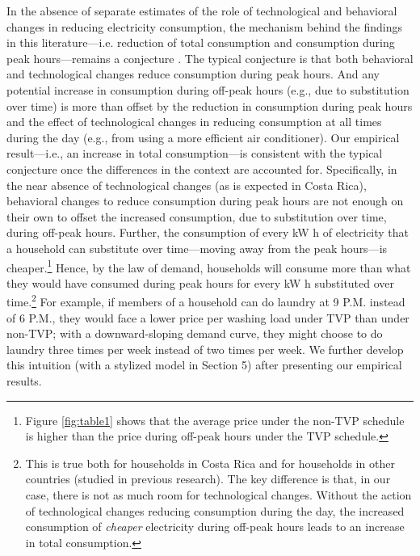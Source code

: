 \documentclass[12pt]{article}
\begin{document}
\sloppy In the absence of separate estimates of the role of technological and behavioral changes in reducing electricity consumption, the mechanism behind the findings in this literature---i.e.  reduction of total consumption and consumption during peak hours---remains a conjecture \citep{allcottRethinkingRealtimeElectricity2011,jessoeUnderstandingRolePrice2014}. The typical conjecture is that both behavioral and technological changes reduce consumption during peak hours. And any potential increase in consumption during off-peak hours (e.g., due to substitution over time) is more than offset by the reduction in consumption during peak hours and the effect of technological changes in reducing consumption at all times during the day (e.g., from using a more efficient air conditioner). Our empirical result---i.e., an increase in total consumption---is consistent with the typical conjecture once the differences in the context are accounted for. Specifically, in the near absence of technological changes (as is expected in Costa Rica), behavioral changes to reduce consumption during peak hours are not enough on their own to offset the increased consumption, due to substitution over time, during off-peak hours. Further, the consumption of every kW h of electricity that a household can substitute over time---moving away from the peak hours---is cheaper.\footnote{Figure \ref{fig:table1} shows that the average price under the non-TVP schedule is higher than the price during off-peak hours under the TVP schedule.} Hence, by the law of demand, households will consume more than what they would have consumed during peak hours for every kW h substituted over time.\footnote{This is true both for households in Costa Rica and for households in other countries (studied in previous research). The key difference is that, in our case, there is not as much room for technological changes. Without the action of technological changes reducing consumption during the day, the increased consumption of \emph{cheaper} electricity during off-peak hours leads to an increase in total consumption.} For example, if members of a household can do laundry at 9 P.M. instead of 6 P.M., they would face a lower price per washing load under TVP than under non-TVP; with a downward-sloping demand curve, they might choose to do laundry three times per week instead of two times per week. We further develop this intuition (with a stylized model in Section 5) after presenting our empirical results.
\end{document}
